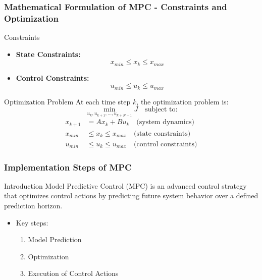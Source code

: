 \documentclass[aspectratio=169]{beamer}
\begin{document}
\begin{frame}[fragile]
    \frametitle{Mathematical Formulation of MPC - Constraints and Optimization}
    \begin{block}{Constraints}
        \begin{itemize}
            \item \textbf{State Constraints:} 
            \begin{equation}
            x_{min} \leq x_k \leq x_{max}
            \end{equation}
            \item \textbf{Control Constraints:} 
            \begin{equation}
            u_{min} \leq u_k \leq u_{max}
            \end{equation}
        \end{itemize}
    \end{block}
    
    \begin{block}{Optimization Problem}
        At each time step \( k \), the optimization problem is:
        \begin{equation}
        \min_{u_k, u_{k+1}, \ldots, u_{k+N-1}} J \quad \text{subject to:}
        \end{equation}
        \begin{align*}
        x_{k+1} &= Ax_k + Bu_k \quad \text{(system dynamics)} \\
        x_{min} &\leq x_k \leq x_{max} \quad \text{(state constraints)} \\
        u_{min} &\leq u_k \leq u_{max} \quad \text{(control constraints)}
        \end{align*}
    \end{block}
\end{frame}

\begin{frame}[fragile]
    \frametitle{Implementation Steps of MPC}
    \begin{block}{Introduction}
    Model Predictive Control (MPC) is an advanced control strategy that optimizes control actions by predicting future system behavior over a defined prediction horizon. 
    \end{block}
    \begin{itemize}
        \item Key steps: 
        \begin{enumerate}
            \item Model Prediction
            \item Optimization
            \item Execution of Control Actions
        \end{enumerate}
    \end{itemize}
\end{frame}
\end{document}

